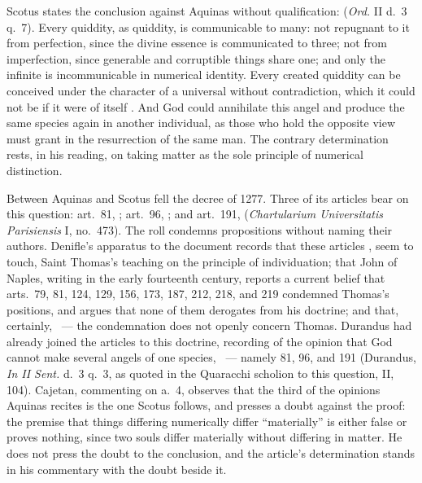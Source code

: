 Scotus states the conclusion against Aquinas without qualification:
(\emph{Ord.} II d.~3 q.~7). Every quiddity, as quiddity, is communicable
to many: not repugnant to it from perfection, since the divine essence is
communicated to three; not from imperfection, since generable and
corruptible things share one; and only the infinite is incommunicable in
numerical identity. Every created quiddity can be conceived under the
character of a universal without contradiction, which it could not be if
it were of itself . And God could annihilate this angel and
produce the same species again in another individual, as those who hold
the opposite view must grant in the resurrection of the same man. The
contrary determination rests, in his reading, on taking matter as the
sole principle of numerical distinction.

Between Aquinas and Scotus fell the decree of 1277. Three of its articles
bear on this question: art.~81, ; art.~96,
; and art.~191,  (\emph{Chartularium Universitatis Parisiensis} I, no.~473). The
roll condemns propositions without naming their authors. Denifle's
apparatus to the document records that these articles , seem to touch, Saint Thomas's teaching on the principle of
individuation; that John of Naples, writing
in the early fourteenth century, reports a current belief that arts.~79,
81, 124, 129, 156, 173, 187, 212, 218, and 219 condemned Thomas's
positions, and argues that none of them derogates from his doctrine; and
that, certainly, ~--- the condemnation does not openly concern Thomas.
Durandus had already joined the articles to this doctrine, recording of
the opinion that God cannot make several angels of one species, ~---
namely 81, 96, and 191 (Durandus, \emph{In II Sent.} d.~3 q.~3, as
quoted in the Quaracchi scholion to this question, II, 104). Cajetan,
commenting on a.~4, observes that the third of the opinions
Aquinas recites is the one Scotus follows, and presses a doubt against
the proof: the premise that things differing numerically differ
``materially'' is either false or proves nothing, since two souls differ
materially without differing in matter. He does not press the doubt to
the conclusion, and the article's determination stands in his commentary
with the doubt beside it.


